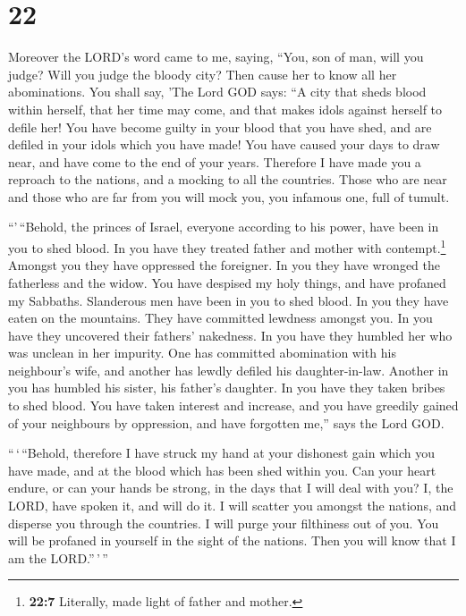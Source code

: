 \hypertarget{section-20}{%
\section{22}\label{section-20}}

 Moreover the LORD's word came to me, saying,
 ``You, son of man, will you judge? Will you judge the
bloody city? Then cause her to know all her abominations. 
You shall say, 'The Lord GOD says: ``A city that sheds blood within
herself, that her time may come, and that makes idols against herself to
defile her!  You have become guilty in your blood that you
have shed, and are defiled in your idols which you have made! You have
caused your days to draw near, and have come to the end of your years.
Therefore I have made you a reproach to the nations, and a mocking to
all the countries.  Those who are near and those who are
far from you will mock you, you infamous one, full of tumult.

 ``'\,``Behold, the princes of Israel, everyone according
to his power, have been in you to shed blood.  In you have
they treated father and mother with contempt.\footnote{\textbf{22:7}
  Literally, made light of father and mother.} Amongst you they have
oppressed the foreigner. In you they have wronged the fatherless and the
widow.  You have despised my holy things, and have
profaned my Sabbaths.  Slanderous men have been in you to
shed blood. In you they have eaten on the mountains. They have committed
lewdness amongst you.  In you have they uncovered their
fathers' nakedness. In you have they humbled her who was unclean in her
impurity.  One has committed abomination with his
neighbour's wife, and another has lewdly defiled his daughter-in-law.
Another in you has humbled his sister, his father's daughter.
 In you have they taken bribes to shed blood. You have
taken interest and increase, and you have greedily gained of your
neighbours by oppression, and have forgotten me,'' says the Lord GOD.

 ``\,`\,``Behold, therefore I have struck my hand at your
dishonest gain which you have made, and at the blood which has been shed
within you.  Can your heart endure, or can your hands be
strong, in the days that I will deal with you? I, the LORD, have spoken
it, and will do it.  I will scatter you amongst the
nations, and disperse you through the countries. I will purge your
filthiness out of you.  You will be profaned in yourself
in the sight of the nations. Then you will know that I am the
LORD.''\,'\,''

